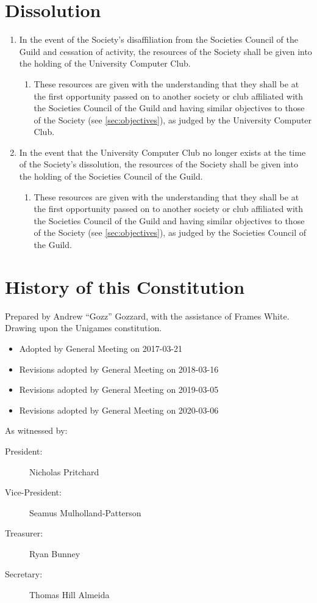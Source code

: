 \documentclass[a4paper]{article}
\newenvironment{enumsection}[1]{\section{#1} \begin{enumerate}[ref=\thesection.\theenumi]}{\end{enumerate}}
\begin{document}
\begin{enumsection}{Dissolution} \label{sec:dissolution}
    \item In the event of the Society's disaffiliation from the Societies Council of the Guild and cessation of activity, the resources of the Society shall be given into the holding of the University Computer Club.
    \begin{enumerate}
        \item These resources are given with the understanding that they shall be at the first opportunity passed on to another society or club affiliated with the Societies Council of the Guild and having similar objectives to those of the Society (see \cref{sec:objectives}), as judged by the University Computer Club.
    \end{enumerate}
    \item In the event that the University Computer Club no longer exists at the time of the Society's dissolution, the resources of the Society shall be given into the holding of the Societies Council of the Guild.
    \begin{enumerate}
        \item These resources are given with the understanding that they shall be at the first opportunity passed on to another society or club affiliated with the Societies Council of the Guild and having similar objectives to those of the Society (see \cref{sec:objectives}), as judged by the Societies Council of the Guild.
    \end{enumerate}
\end{enumsection}

\appendixpage

\appendix \section{History of this Constitution} \label{app:history}

\noindent Prepared by Andrew ``Gozz'' Gozzard, with the assistance of Frames White. Drawing upon the Unigames constitution.

\medskip{}

\begin{itemize}
    \item[] Adopted by General Meeting on 2017-03-21
    \item[] Revisions adopted by General Meeting on 2018-03-16
    \item[] Revisions adopted by General Meeting on 2019-03-05
    \item[] Revisions adopted by General Meeting on 2020-03-06
\end{itemize}

\medskip{}

\noindent As witnessed by:
\begin{description}
\item [{President:}] Nicholas Pritchard \hrulefill
\item [{Vice-President:}] Seamus Mulholland-Patterson \hrulefill
\item [{Treasurer:}] Ryan Bunney \hrulefill
\item [{Secretary:}] Thomas Hill Almeida \hrulefill
\end{description}
\end{document}
